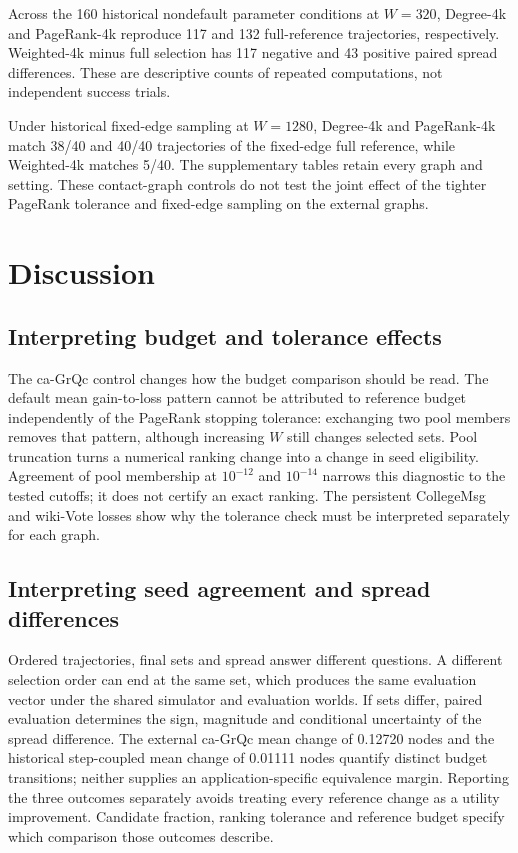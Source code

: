 \documentclass[smallextended]{svjour3}
\begin{document}
Across the 160 historical nondefault parameter conditions at $W=320$, Degree-4k and PageRank-4k reproduce 117 and 132 full-reference trajectories, respectively. Weighted-4k minus full selection has 117 negative and 43 positive paired spread differences. These are descriptive counts of repeated computations, not independent success trials.

Under historical fixed-edge sampling at $W=1280$, Degree-4k and PageRank-4k match 38/40 and 40/40 trajectories of the fixed-edge full reference, while Weighted-4k matches 5/40. The supplementary tables retain every graph and setting. These contact-graph controls do not test the joint effect of the tighter PageRank tolerance and fixed-edge sampling on the external graphs.
\FloatBarrier

\section{Discussion}
\subsection{Interpreting budget and tolerance effects}
The ca-GrQc control changes how the budget comparison should be read. The default mean gain-to-loss pattern cannot be attributed to reference budget independently of the PageRank stopping tolerance: exchanging two pool members removes that pattern, although increasing $W$ still changes selected sets. Pool truncation turns a numerical ranking change into a change in seed eligibility. Agreement of pool membership at $10^{-12}$ and $10^{-14}$ narrows this diagnostic to the tested cutoffs; it does not certify an exact ranking. The persistent CollegeMsg and wiki-Vote losses show why the tolerance check must be interpreted separately for each graph.

\subsection{Interpreting seed agreement and spread differences}
Ordered trajectories, final sets and spread answer different questions. A different selection order can end at the same set, which produces the same evaluation vector under the shared simulator and evaluation worlds. If sets differ, paired evaluation determines the sign, magnitude and conditional uncertainty of the spread difference. The external ca-GrQc mean change of 0.12720 nodes and the historical step-coupled mean change of 0.01111 nodes quantify distinct budget transitions; neither supplies an application-specific equivalence margin. Reporting the three outcomes separately avoids treating every reference change as a utility improvement. Candidate fraction, ranking tolerance and reference budget specify which comparison those outcomes describe.
\end{document}
